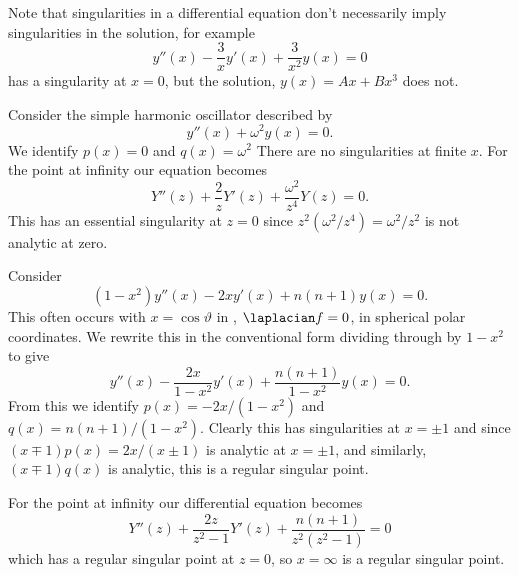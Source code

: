 \documentclass[fleqn]{NotesClass}
\begin{document}
    Note that singularities in a differential equation don't necessarily imply singularities in the solution, for example
    \begin{equation}
        y''(x) - \frac{3}{x}y'(x) + \frac{3}{x^2}y(x) = 0
    \end{equation}
    has a singularity at \(x = 0\), but the solution, \(y(x) = Ax + Bx^3\) does not.
    
    \begin{exm}{}{}
        Consider the simple harmonic oscillator described by
        \begin{equation}
            y''(x) + \omega^2 y(x) = 0.
        \end{equation}
        We identify \(p(x) = 0\) and \(q(x) = \omega^2\)
        There are no singularities at finite \(x\).
        For the point at infinity our equation becomes
        \begin{equation}
            Y''(z) + \frac{2}{z}Y'(z) + \frac{\omega^2}{z^4}Y(z) = 0.
        \end{equation}
        This has an essential singularity at \(z = 0\) since \(z^2(\omega^2/z^4) = \omega^2/z^2\) is not analytic at zero.
    \end{exm}
    
    \begin{exm}{}{}
        Consider 
        \begin{equation}
            (1 - x^2)y''(x) - 2xy'(x) + n(n + 1)y(x) = 0.
        \end{equation}
        This often occurs with \(x = \cos\vartheta\) in , \(\laplacian f = 0\), in spherical polar coordinates.
        We rewrite this in the conventional form dividing through by \(1 - x^2\) to give
        \begin{equation}
            y''(x) - \frac{2x}{1 - x^2}y'(x) + \frac{n(n + 1)}{1 - x^2}y(x) = 0.
        \end{equation}
        From this we identify \(p(x) = -2x/(1 - x^2)\) and \(q(x) = n(n+1)/(1 - x^2)\).
        Clearly this has singularities at \(x = \pm 1\) and since \((x \mp 1)p(x) = 2x/(x \pm 1)\) is analytic at \(x = \pm 1\), and similarly, \((x \mp 1)q(x)\) is analytic, this is a regular singular point.
        
        For the point at infinity our differential equation becomes
        \begin{equation}
            Y''(z) + \frac{2z}{z^2 - 1} Y'(z) + \frac{n(n + 1)}{z^2(z^2 - 1)} = 0
        \end{equation}
        which has a regular singular point at \(z = 0\), so \(x = \infty\) is a regular singular point.
    \end{exm}
    
\end{document}

